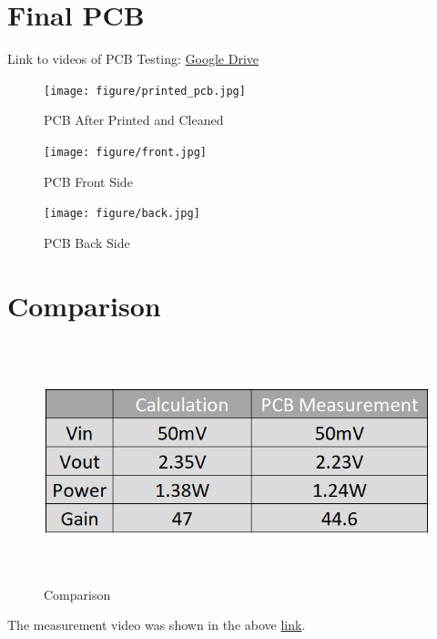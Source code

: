 \documentclass[twoside, a4paper, leqno]{article}
\begin{document}
		\section{Final PCB}
			Link to videos of PCB Testing: \href{https://drive.google.com/drive/folders/1nDNt05Fzzyz6RCWw_HlSfpCo1h1K3wNv?usp=sharing}{Google Drive}
			
			\begin{center}
				\begin{figure}[htp]
					\begin{center}
						\texttt{[image: figure/printed\_pcb.jpg]}
					\end{center}
					\caption{PCB After Printed and Cleaned}
					\label{refFigure16}
				\end{figure}
			\end{center}
			
			\begin{center}
				\begin{figure}[htp]
					\begin{center}
						\texttt{[image: figure/front.jpg]}
					\end{center}
					\caption{PCB Front Side}
					\label{refFigure17}
					\begin{center}
						\texttt{[image: figure/back.jpg]}
					\end{center}
					\caption{PCB Back Side}
					\label{refFigure18}
				\end{figure}
			\end{center}
		
		\newpage
		\section{Comparison}
		\begin{center}
			\begin{figure}[htp]
				\begin{center}
					\includegraphics[height=7cm]{figure/comp.png}
				\end{center}
				\caption{Comparison}
				\label{refFigure19}
			\end{figure}
		\end{center}
		The measurement video was shown in the above \href{https://drive.google.com/drive/folders/1nDNt05Fzzyz6RCWw_HlSfpCo1h1K3wNv?usp=sharing}{link}.
		
\end{document}

